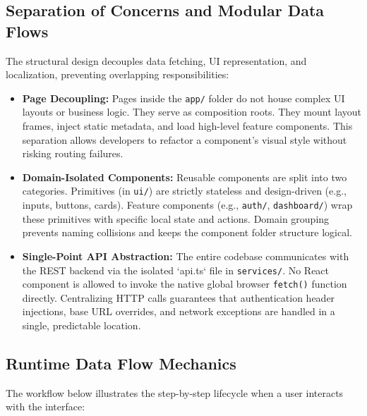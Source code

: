 \documentclass[12pt,a4paper]{article}
\begin{document}
\subsection{Separation of Concerns and Modular Data Flows}

The structural design decouples data fetching, UI representation, and localization, preventing overlapping responsibilities:
\begin{itemize}[leftmargin=2em]
    \item \textbf{Page Decoupling:} Pages inside the \texttt{app/} folder do not house complex UI layouts or business logic. They serve as composition roots. They mount layout frames, inject static metadata, and load high-level feature components. This separation allows developers to refactor a component's visual style without risking routing failures.
    \item \textbf{Domain-Isolated Components:} Reusable components are split into two categories. Primitives (in \texttt{ui/}) are strictly stateless and design-driven (e.g., inputs, buttons, cards). Feature components (e.g., \texttt{auth/}, \texttt{dashboard/}) wrap these primitives with specific local state and actions. Domain grouping prevents naming collisions and keeps the component folder structure logical.
    \item \textbf{Single-Point API Abstraction:} The entire codebase communicates with the REST backend via the isolated `api.ts` file in \texttt{services/}. No React component is allowed to invoke the native global browser \texttt{fetch()} function directly. Centralizing HTTP calls guarantees that authentication header injections, base URL overrides, and network exceptions are handled in a single, predictable location.
\end{itemize}

\subsection{Runtime Data Flow Mechanics}

The workflow below illustrates the step-by-step lifecycle when a user interacts with the interface:
\end{document}

